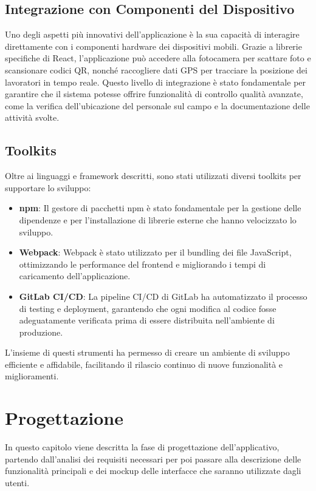 \documentclass[twoside]{supsistudent}
\begin{document}
\section{Integrazione con Componenti del Dispositivo}

Uno degli aspetti più innovativi dell'applicazione è la sua capacità di interagire direttamente con i componenti hardware dei dispositivi mobili. Grazie a librerie specifiche di React, l'applicazione può accedere alla fotocamera per scattare foto e scansionare codici QR, nonché raccogliere dati GPS per tracciare la posizione dei lavoratori in tempo reale. Questo livello di integrazione è stato fondamentale per garantire che il sistema potesse offrire funzionalità di controllo qualità avanzate, come la verifica dell'ubicazione del personale sul campo e la documentazione delle attività svolte.

\section{Toolkits}

Oltre ai linguaggi e framework descritti, sono stati utilizzati diversi toolkits per supportare lo sviluppo:

\begin{itemize}
  \item \textbf{npm}: Il gestore di pacchetti npm è stato fondamentale per la gestione delle dipendenze e per l'installazione di librerie esterne che hanno velocizzato lo sviluppo.
  \item \textbf{Webpack}: Webpack è stato utilizzato per il bundling dei file JavaScript, ottimizzando le performance del frontend e migliorando i tempi di caricamento dell'applicazione.
  \item \textbf{GitLab CI/CD}: La pipeline CI/CD di GitLab ha automatizzato il processo di testing e deployment, garantendo che ogni modifica al codice fosse adeguatamente verificata prima di essere distribuita nell'ambiente di produzione.
\end{itemize}

L'insieme di questi strumenti ha permesso di creare un ambiente di sviluppo efficiente e affidabile, facilitando il rilascio continuo di nuove funzionalità e miglioramenti.

\chapter{Progettazione}

In questo capitolo viene descritta la fase di progettazione dell’applicativo, partendo dall'analisi dei requisiti necessari per poi passare alla descrizione delle funzionalità principali e dei mockup delle interfacce che saranno utilizzate dagli utenti.
\end{document}
